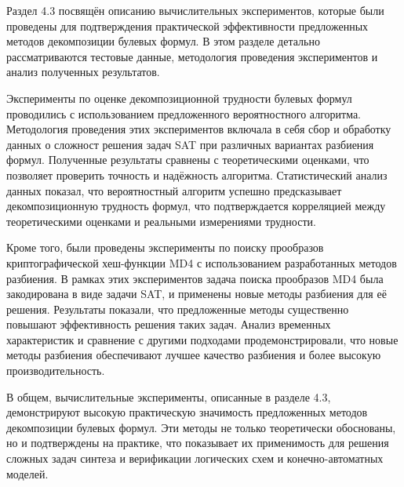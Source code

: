 
Раздел 4.3 посвящён описанию вычислительных экспериментов, которые были проведены для подтверждения практической эффективности предложенных методов декомпозиции булевых формул.
В этом разделе детально рассматриваются тестовые данные, методология проведения экспериментов и анализ полученных результатов.


Эксперименты по оценке декомпозиционной трудности булевых формул проводились с использованием предложенного вероятностного алгоритма.
Методология проведения этих экспериментов включала в себя сбор и обработку данных о сложност решения задач SAT при различных вариантах разбиения формул.
Полученные результаты сравнены с теоретическими оценками, что позволяет проверить точность и надёжность алгоритма.
Статистический анализ данных показал, что вероятностный алгоритм успешно предсказывает декомпозиционную трудность формул, что подтверждается корреляцией между теоретическими оценками и реальными измерениями трудности.

Кроме того, были проведены эксперименты по поиску прообразов криптографической хеш-функции MD4 с использованием разработанных методов разбиения. В рамках этих экспериментов задача поиска прообразов MD4 была закодирована в виде задачи SAT, и применены новые методы разбиения для её решения. Результаты показали, что предложенные методы существенно повышают эффективность решения таких задач. Анализ временных характеристик и сравнение с другими подходами продемонстрировали, что новые методы разбиения обеспечивают лучшее качество разбиения и более высокую производительность.

В общем, вычислительные эксперименты, описанные в разделе 4.3, демонстрируют высокую практическую значимость предложенных методов декомпозиции булевых формул. Эти методы не только теоретически обоснованы, но и подтверждены на практике, что показывает их применимость для решения сложных задач синтеза и верификации логических схем и конечно-автоматных моделей.



